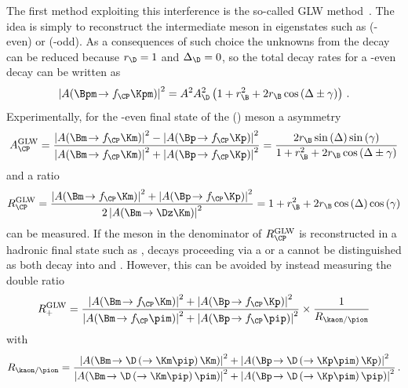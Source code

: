 The first method exploiting this interference is the so-called GLW method~\mbox{\cite{GLW_1, GLW_2}}.
The idea is simply to reconstruct the intermediate \D meson in \CP eigenstates such as \Kp\Km (\CP-even) or \KS\piz (\CP-odd).
As a consequences of such choice the unknowns from the \D decay can be reduced because $r_\D=1$ and $\Delta_\D=0$, so the total decay rates for \eg a \CP-even \D decay can be written as
\begin{equation}
\left|A\!\left(\Bpm\!\to f_{\CP}\Kpm\right)\right|^2=A^2A_\D^2\left(1+r_\B^2+2r_\B\cos\left(\Delta\pm\gamma\right)\right)\,.\label{eq:totDecRateGLW}
\end{equation}
Experimentally, for the \CP-even final state of the \Dz (\Dzb) meson a \CP asymmetry
\begin{equation}
A_{\CP}^{\text{GLW}}=\frac{\left|A\!\left(\Bm\!\to f_{\CP}\Km\right)\right|^2-\left|A\!\left(\Bp\!\to f_{\CP}\Kp\right)\right|^2}{\left|A\!\left(\Bm\!\to f_{\CP}\Km\right)\right|^2+\left|A\!\left(\Bp\!\to f_{\CP}\Kp\right)\right|^2}=\frac{2r_\B\sin\left(\Delta\right)\sin\left(\gamma\right)}{1+r_\B^2+2r_\B\cos\left(\Delta\pm\gamma\right)}\label{eq:ACP_GLW}
\end{equation}
and a \CP ratio
\begin{equation}
R_{\CP}^{\text{GLW}}=\frac{\left|A\!\left(\Bm\!\to f_{\CP}\Km\right)\right|^2+\left|A\!\left(\Bp\!\to f_{\CP}\Kp\right)\right|^2}{2\left|A\!\left(\Bm\!\to\Dz\Km\right)\right|^2}=1+r_\B^2+2r_\B\cos\left(\Delta\right)\cos\left(\gamma\right)\label{eq:RCP_GLW}
\end{equation}
can be measured.
If the \D meson in the denominator of $R_{\CP}^{\text{GLW}}$ is reconstructed in a hadronic final state such as \kaon\pion, decays proceeding via a \Dz or a \Dzb cannot be distinguished as both decay into \Kp\pim and \Km\pip.
However, this can be avoided by instead measuring the double ratio
\begin{equation}
R_{+}^{\text{GLW}}=\frac{\left|A\!\left(\Bm\!\to f_{\CP}\Km\right)\right|^2+\left|A\!\left(\Bp\!\to f_{\CP}\Kp\right)\right|^2}{\left|A\!\left(\Bm\!\to f_{\CP}\pim\right)\right|^2+\left|A\!\left(\Bp\!\to f_{\CP}\pip\right)\right|^2}\times\frac{1}{R_{\kaon/\pion}}
\end{equation}
with
\begin{equation}
R_{\kaon/\pion}=\frac{\left|A\!\left(\Bm\!\to \D\left(\to\Km\pip\right)\Km\right)\right|^2+\left|A\!\left(\Bp\!\to \D\left(\to\Kp\pim\right)\Kp\right)\right|^2}{\left|A\!\left(\Bm\!\to \D\left(\to\Km\pip\right)\pim\right)\right|^2+\left|A\!\left(\Bp\!\to \D\left(\to\Kp\pim\right)\pip\right)\right|^2}\,.
\end{equation}
